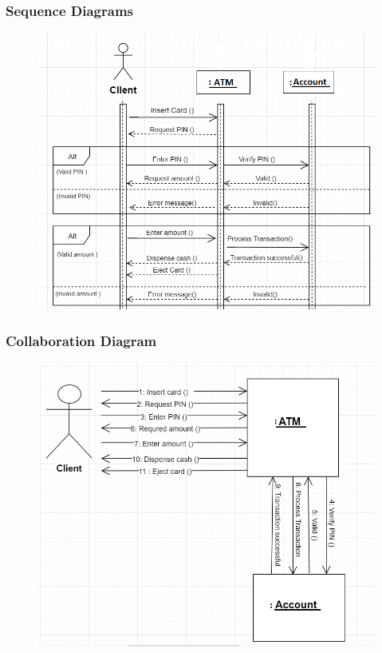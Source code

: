 \documentclass{article}
\begin{document}
		\newpage\subsubsection{Sequence Diagrams}
		\begin{figure}[h!]
		  \includegraphics[width=\linewidth]{img/withdraw_sequence.png}
		\end{figure}

		\newpage\subsubsection{Collaboration Diagram}	
		\begin{figure}[h!]
		  \includegraphics[width=\linewidth]{img/withdraw_collaboration.png}
		\end{figure}
\end{document}
